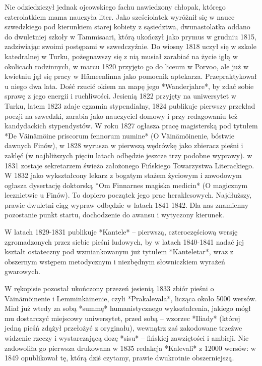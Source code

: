 Nie odziedziczył jednak ojcowskiego fachu nawiedzony chłopak, którego czterolatkiem mama nauczyła liter. Jako sześciolatek wyróżnił się w nauce szwedzkiego pod kierunkiem starej kobiety z sąsiedztwa, dwunastolatka oddano do dwuletniej szkoły w Tammisaari, którą ukończył jako prymus w grudniu 1815, zadziwiając swoimi postępami w szwedczyźnie. Do wiosny 1818 uczył się w szkole katedralnej w Turku, pożegnawszy się z nią musiał zarabiać na życie igłą w okolicach rodzinnych, w marcu 1820 przyjęto go do liceum w Porvoo, ale już w kwietniu jął się pracy w Hämeenlinna jako pomocnik aptekarza. Przepraktykował u niego dwa lata. Dość rzucić okiem na mapę jego *Wanderjahre*, by zdać sobie sprawę z jego energii i ruchliwości. Jesienią 1822 przyjęty na uniwersytet w Turku, latem 1823 zdaje egzamin stypendialny, 1824 publikuje pierwszy przekład poezji na szwedzki, zarabia jako nauczyciel domowy i przy redagowaniu też kandydackich stypendystów. W roku 1827 ogłasza pracę magisterską pod tytułem *De Väinämöine priscorum fennorum numine* (O Väinämöinenie, bóstwie dawnych Finów), w 1828 wyrusza w pierwszą wędrówkę jako zbieracz pieśni i zaklęć (w najbliższych pięciu latach odbędzie jeszcze trzy podobne wyprawy). w 1831 zostaje sekretarzem świeżo założonego Fińskiego Towarzystwa Literackiego. W 1832 jako wykształcony lekarz z bogatym stażem życiowym i zawodowym ogłasza dysertację doktorską *Om Finnarnes magiska medicin* (O magicznym lecznictwie u Finów). To dopiero początek jego prac heraklesowych. Najdłuższy, prawie dwuletni ciąg wypraw odbędzie w latach 1841-1842. Dla nas znamienny pozostanie punkt startu, dochodzenie do awansu i wytyczony kierunek.

W latach 1829-1831 publikuje *Kantele* -- pierwszą, czteroczęściową wersję zgromadzonych przez siebie pieśni ludowych, by w latach 1840-1841 nadać jej kształt ostateczny pod wzmiankowanym już tytułem *Kanteletar*, wraz z obszernym wstępem metodycznym i niezbędnym słowniczkiem wyrażeń gwarowych.

W rękopisie pozostał ukończony przezeń jesienią 1833 zbiór pieśni o Väinämöinenie i Lemminkäinenie, czyli *Prakalevala*, licząca około 5000 wersów. Miał już wtedy za sobą *summę* humanistycznego wykształcenia, jakiego mógł mu dostarczyć miejscowy uniwersytet, przed sobą -- wzorzec *Iliady* (której jedną pieśń zdążył przełożyć z oryginału), wewnątrz zaś zakodowane trzeźwe widzenie rzeczy i wystarczającą dozę *sisu* -- fińskiej zawziętości i ambicji. Nie zadowoliła go pierwsza drukowana w 1835 redakcja *Kalevali* z 12000 wersów: w 1849 opublikował tę, którą dziś czytamy, prawie dwukrotnie obszerniejszą.

